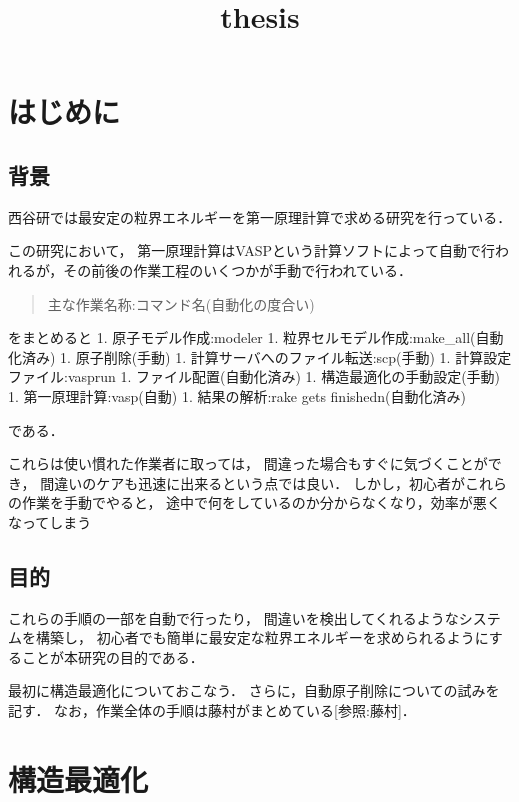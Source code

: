 \documentclass[11pt,dvipdfmx]{jsarticle}
\title{thesis}
\begin{document}
    
    
    \maketitle
    
    

    
    \section{はじめに}\label{ux306fux3058ux3081ux306b}

    \subsection{背景}\label{ux80ccux666f}

    西谷研では最安定の粒界エネルギーを第一原理計算で求める研究を行っている．

この研究において，
第一原理計算はVASPという計算ソフトによって自動で行われるが，その前後の作業工程のいくつかが手動で行われている．

\begin{quote}
主な作業名称:コマンド名(自動化の度合い)
\end{quote}
をまとめると 1. 原子モデル作成:modeler 1.
粒界セルモデル作成:make\_all(自動化済み) 1. 原子削除(手動) 1.
計算サーバへのファイル転送:scp(手動) 1. 計算設定ファイル:vasprun 1.
ファイル配置(自動化済み) 1. 構造最適化の手動設定(手動) 1.
第一原理計算:vasp(自動) 1. 結果の解析:rake gets finishedn(自動化済み)

である．

これらは使い慣れた作業者に取っては，
間違った場合もすぐに気づくことができ，
間違いのケアも迅速に出来るという点では良い．
しかし，初心者がこれらの作業を手動でやると，
途中で何をしているのか分からなくなり，効率が悪くなってしまう

\subsection{目的}\label{ux76eeux7684}

これらの手順の一部を自動で行ったり，
間違いを検出してくれるようなシステムを構築し，
初心者でも簡単に最安定な粒界エネルギーを求められるようにすることが本研究の目的である．

最初に構造最適化についておこなう．
さらに，自動原子削除についての試みを記す．
なお，作業全体の手順は藤村がまとめている{[}参照:藤村{]}．

    \section{構造最適化}\label{ux69cbux9020ux6700ux9069ux5316}
\end{document}
